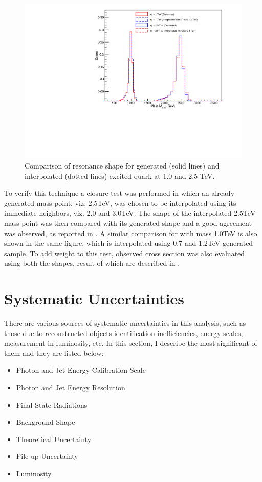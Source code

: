 \begin{figure}[h!]
\centering
 \includegraphics[width=15cm,height=8cm]{ch5/plots/InterpolationPlots/GenVsIP_massPlot_1TeV_2p5TeV.pdf}
 \caption{Comparison of \qstar resonance shape for generated (solid lines) and interpolated (dotted lines) excited quark at 1.0 and 2.5 TeV.}
 \label{fig:ComGenIP2500}
\end{figure}

To verify this technique a closure test was performed in which an already generated mass point, viz. 2.5\unit{TeV}, was chosen to be interpolated 
using its immediate neighbors, viz. 2.0 and 3.0\unit{TeV}. The shape of the interpolated 2.5\unit{TeV} mass point was then compared with its
generated shape and a good agreement was observed, as reported in \fig{\ref{fig:ComGenIP2500}}. A similar comparison for \qstar with mass 
1.0\unit{TeV} is also shown in the same figure, which is interpolated using 0.7 and 1.2\unit{TeV} generated \qstar sample. To add weight to this 
test, observed cross section was also evaluated using both the shapes, result of which are described in \sectn{\ref{Se:optimization}}.


\section{Systematic Uncertainties}\label{Se:SysUnc}
There are various sources of systematic uncertainties in this analysis, such as those due to reconstructed objects identification 
inefficiencies, energy scales, measurement in luminosity, etc. In this section, I describe the most significant of them and they 
are listed below:
\begin{itemize}
\item Photon and Jet Energy Calibration Scale
\item Photon and Jet Energy Resolution 
\item Final State Radiations 
\item Background Shape
\item Theoretical Uncertainty
\item Pile-up Uncertainty
\item Luminosity
\end{itemize}

